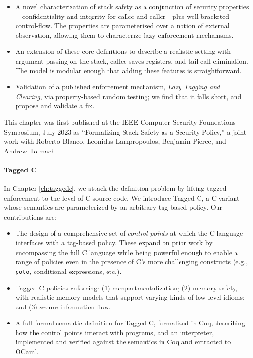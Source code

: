 \documentclass{report}
\begin{document}
\begin{itemize}
  \item A novel characterization of stack safety as a conjunction
        of security properties---confidentiality and integrity for callee
        and caller---plus well-bracketed control-flow.
        The properties are parameterized over a notion of
        external observation, allowing them to characterize lazy enforcement
        mechanisms.
  \item An extension of these core definitions to
        describe a realistic setting with argument passing on the stack,
        callee-saves registers, and tail-call elimination. The model is
        modular enough that adding these features is straightforward.
  \item Validation of a published enforcement mechanism,
        \emph{Lazy Tagging and Clearing}, via property-based random testing; we find that
        it falls short, and propose and validate a fix.
\end{itemize}

This chapter was first published at the IEEE Computer Security Foundations Symposium,
July 2023 as ``Formalizing Stack Safety as a Security Policy,'' a
joint work with Roberto Blanco, Leonidas Lampropoulos, Benjamin Pierce, and Andrew Tolmach
\cite{Anderson23:StackSafety}.

\paragraph{Tagged C}

In Chapter \ref{ch:taggedc}, we attack the definition problem by lifting tagged enforcement
to the level of C source code. We introduce Tagged C, a C variant whose semantics are parameterized
by an arbitrary tag-based policy. Our contributions are:

\begin{itemize}
\item The design of a comprehensive set of {\em control points} at which the C language interfaces
  with a tag-based policy. These expand on prior work by encompassing the full C language
  while being powerful enough to enable a range of policies even in the presence of C's more
  challenging constructs (e.g., {\tt goto}, conditional expressions, etc.).
\item Tagged C policies enforcing: (1) compartmentalization;
  (2) memory safety, with realistic memory models that support varying kinds of low-level idioms;
  and (3) secure information flow.
\item A full formal semantic definition for Tagged C, formalized in Coq, describing how the
  control points interact with programs, and an interpreter, implemented and verified against
  the semantics in Coq and extracted to OCaml.
\end{itemize}
\end{document}
